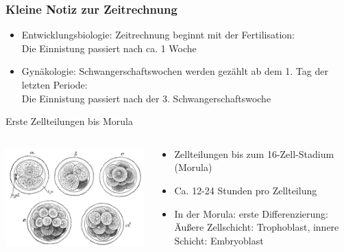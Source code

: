 \documentclass{beamer}
\begin{document}
\begin{frame}
\frametitle{Kleine Notiz zur Zeitrechnung}

\begin{itemize}
\item
Entwicklungsbiologie: Zeitrechnung beginnt mit der Fertilisation: \\
Die Einnistung passiert nach ca. 1 Woche
\pause
\item
Gynäkologie: Schwangerschaftswochen werden gezählt ab dem 1. Tag der letzten Periode: \\
Die Einnistung passiert nach der 3. Schwangerschaftswoche

\end{itemize}
\end{frame}


\begin{frame}{Erste Zellteilungen bis Morula}

\begin{columns}[c]


\begin{column}{5cm}
\begin{center}
    \includegraphics[width=\textwidth]{Gray9.png}


\end{center}

\end{column}

\begin{column}{5cm}

\begin{itemize}
    \item Zellteilungen bis zum 16-Zell-Stadium (Morula)
    \item 
    Ca. 12-24 Stunden pro Zellteilung
    \item 
    In der Morula: erste Differenzierung: Äußere Zellschicht: Trophoblast, innere Schicht: Embryoblast 
    
\end{itemize}

\end{column}

\end{columns}



\end{frame}
\end{document}
